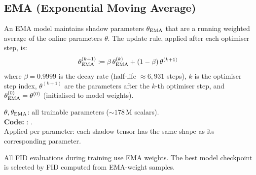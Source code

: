 \subsection{EMA (Exponential Moving Average)}
\label{sec:ema}

An EMA model maintains shadow parameters $\theta_{\mathrm{EMA}}$ that are a running
weighted average of the online parameters $\theta$.  The update rule, applied
after each optimiser step, is:
\begin{equation}
  \theta_{\mathrm{EMA}}^{(k+1)}
    \coloneqq \beta\,\theta_{\mathrm{EMA}}^{(k)} + (1-\beta)\,\theta^{(k+1)}
  \label{eq:ema}
\end{equation}
where $\beta = 0.9999$ is the decay rate (half-life $\approx 6{,}931$ steps),
$k$ is the optimiser step index, $\theta^{(k+1)}$ are the parameters after the
$k$-th optimiser step, and $\theta_{\mathrm{EMA}}^{(0)} = \theta^{(0)}$ (initialised to
model weights).
\begin{shapes}
$\theta, \theta_{\mathrm{EMA}}$: all trainable parameters (${\sim}178$\,M scalars).\\
\textbf{Code:} : .\\
Applied per-parameter: each shadow tensor has the same shape as its corresponding parameter.
\end{shapes}

\noindent
All FID evaluations during training use EMA weights.  The best model checkpoint
is selected by FID computed from EMA-weight samples.
